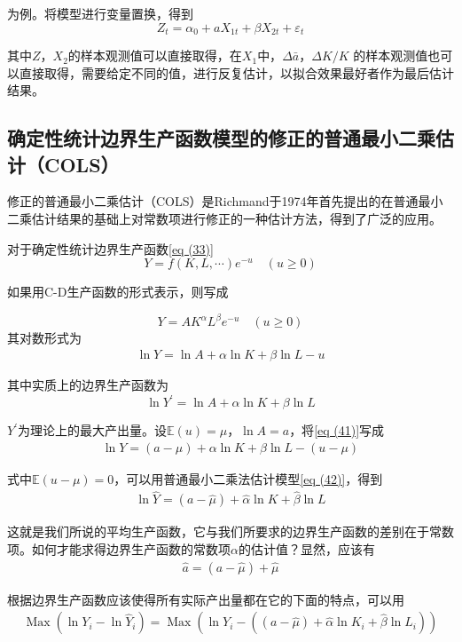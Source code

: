 	为例。将模型进行变量置换，得到
	$$ Z_{t}=\alpha_{0}+a X_{1 t}+\beta X_{2 t}+\varepsilon_{t} $$ 
		
	其中$ Z $，$ X_{2} $的样本观测值可以直接取得，在$ X_{1} $中，$ \Delta \bar{a} $，$ \Delta K/K $ 的样本观测值也可以直接取得，需要给定不同的值，进行反复估计，以拟合效果最好者作为最后估计结果。

\subsection{确定性统计边界生产函数模型的修正的普通最小二乘估计（COLS）}
		
	修正的普通最小二乘估计（COLS）是Richmand于1974年首先提出的在普通最小二乘估计结果的基础上对常数项进行修正的一种估计方法，得到了广泛的应用。
		
	对于确定性统计边界生产函数\eqref{eq (33)} 
	$$ Y=f(K, L, \cdots) e^{-u} \quad(u \geq 0) $$

	如果用C-D生产函数的形式表示，则写成

	$$ Y=A K^{\alpha} L^{\beta} e^{-u} \quad(u \geq 0) $$
	其对数形式为
	\begin{align}
		\ln Y=\ln A+\alpha \ln K+\beta \ln L-u \label{eq (41)}
	\end{align}

	其中实质上的边界生产函数为
	$$ \ln Y^{\prime}=\ln A+\alpha \ln K+\beta \ln L $$

	$ Y^{\prime} $为理论上的最大产出量。设$ \mathbb{E} (u)=\mu $，$ \ln A=a $，将\eqref{eq (41)}写成
	\begin{align}
		\ln Y=(a-\mu)+\alpha \ln K+\beta \ln L-(u-\mu)  \label{eq (42)}
	\end{align}

	式中$ \mathbb{E}\left ( u-\mu \right ) = 0 $，可以用普通最小二乘法估计模型\eqref{eq (42)}，得到
	\begin{align}
		\ln \hat{Y}=(a-\hat{\mu})+\hat{\alpha} \ln K+\hat{\beta} \ln L \label{eq (43)}
	\end{align}
		
	这就是我们所说的平均生产函数，它与我们所要求的边界生产函数的差别在于常数项。如何才能求得边界生产函数的常数项$ \alpha $的估计值？显然，应该有
	\begin{align}
		\hat{a}=(a-\hat{\mu})+\hat{\mu}  \label{eq (44)}
	\end{align}	

	根据边界生产函数应该使得所有实际产出量都在它的下面的特点，可以用
	\begin{align}
		\operatorname{Max}\left(\ln Y_{i}-\ln \hat{Y}_{i}\right)=\operatorname{Max}\left(\ln Y_{i}-\left((a-\hat{\mu})+\hat{\alpha} \ln K_{i}+\hat{\beta} \ln L_{i}\right)\right)
		\label{eq (45)}
	\end{align}	

